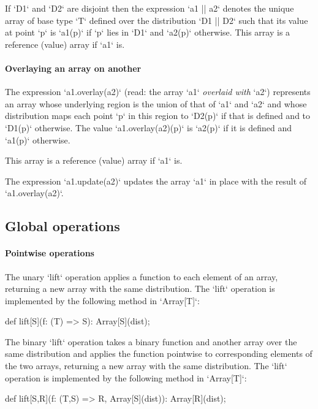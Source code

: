 {If \xcd`D1` and \xcd`D2` are disjoint then the expression \xcd`a1 || a2` denotes the unique array of base type \xcd`T` defined over the
distribution \xcd`D1 || D2` such that its value at point \xcd`p` is
\xcd`a1(p)` if \xcd`p` lies in \xcd`D1` and \xcd`a2(p)`
otherwise. This array is a reference (value) array if \xcd`a1` is.

\paragraph{Overlaying an array on another}
The expression
\xcd`a1.overlay(a2)` (read: the array \xcd`a1` {\em overlaid with} \xcd`a2`)
represents an array whose underlying region is the union of that of
\xcd`a1` and \xcd`a2` and whose distribution maps each point \xcd`p`
in this region to \xcd`D2(p)` if that is defined and to \xcd`D1(p)`
otherwise. The value \xcd`a1.overlay(a2)(p)` is \xcd`a2(p)` if it is defined and \xcd`a1(p)` otherwise.

This array is a reference (value) array if \xcd`a1` is.

The expression \xcd`a1.update(a2)` updates the array \xcd`a1` in place
with the result of \xcd`a1.overlay(a2)`.




\subsection{Global operations }

\paragraph{Pointwise operations}\label{ArrayPointwise}
The unary \xcd`lift` operation applies a function to each element of
an array, returning a new array with the same distribution.
The \xcd`lift` operation is implemented by the following method
in \xcd`Array[T]`:
\begin{xten}
def lift[S](f: (T) => S): Array[S](dist);
\end{xten}

The binary \xcd`lift` operation takes a binary function and
another
array over the same distribution and applies the function
pointwise to corresponding elements of the two arrays, returning
a new array with the same distribution.
The \xcd`lift` operation is implemented by the following method
in \xcd`Array[T]`:
\begin{xten}
def lift[S,R](f: (T,S) => R, Array[S](dist)): Array[R](dist);
\end{xten}

}
